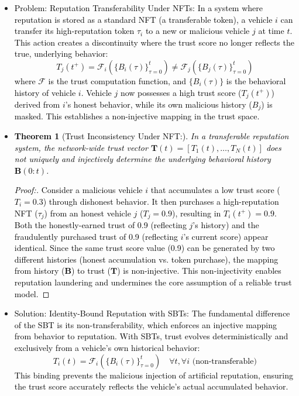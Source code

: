 \cite{cho2010survey}\documentclass[journal,comsoc,twoside]{IEEEtran}
\newtheorem{theorem}{Theorem}
\begin{document}
\begin{itemize}
    \item \textcolor{black}{Problem: Reputation Transferability Under NFTs:
    In a system where reputation is stored as a standard NFT (a transferable token), a vehicle $i$ can transfer its high-reputation token $\tau_i$ to a new or malicious vehicle $j$ at time $t$. This action creates a discontinuity where the trust score no longer reflects the true, underlying behavior:}
    \textcolor{black}{\begin{equation}
    T_j(t^+) = \mathcal{F}_i(\{B_i(\tau)\}_{\tau=0}^{t}) \neq \mathcal{F}_j(\{B_j(\tau)\}_{\tau=0}^{t})
    \label{nft_transfer}
    \end{equation}
    where $\mathcal{F}$ is the trust computation function, and $\{B_i(\tau)\}$ is the behavioral history of vehicle $i$. Vehicle $j$ now possesses a high trust score ($T_j(t^+)$) derived from $i$'s honest behavior, while its own malicious history ($B_j$) is masked. This establishes a non-injective mapping in the trust space.}

    \item \textcolor{black}{
    \begin{theorem}[Trust Inconsistency Under NFT:]
    \label{thm:nft_noninjective}
    In a transferable reputation system, the network-wide trust vector $\mathbf{T}(t) = [T_1(t), \ldots, T_N(t)]$ does not uniquely and injectively determine the underlying behavioral history $\mathbf{B}(0:t)$.
    \end{theorem}
    }
    \textcolor{black}{
    \begin{proof}[Proof:]
    Consider a malicious vehicle $i$ that accumulates a low trust score ($T_i = 0.3$) through dishonest behavior. It then purchases a high-reputation NFT ($\tau_j$) from an honest vehicle $j$ ($T_j = 0.9$), resulting in $T_i(t^+) = 0.9$. Both the honestly-earned trust of 0.9 (reflecting $j$'s history) and the fraudulently purchased trust of 0.9 (reflecting $i$'s current score) appear identical. Since the same trust score value (0.9) can be generated by two different histories (honest accumulation vs. token purchase), the mapping from history ($\mathbf{B}$) to trust ($\mathbf{T}$) is non-injective. This non-injectivity enables reputation laundering and undermines the core assumption of a reliable trust model.
    \end{proof} }

    \item \textcolor{black}{Solution: Identity-Bound Reputation with SBTs:
    The fundamental difference of the SBT is its non-transferability, which enforces an injective mapping from behavior to reputation. With SBTs, trust evolves deterministically and exclusively from a vehicle's own historical behavior:}
    \textcolor{black}{
    \begin{equation}
    \label{sbt_injective}
    T_i(t) = \mathcal{F}_i(\{B_i(\tau)\}_{\tau=0}^{t}) \quad \forall t, \forall i \text{ (non-transferable)}
    \end{equation}
    This binding prevents the malicious injection of artificial reputation, ensuring the trust score accurately reflects the vehicle's actual accumulated behavior.}


\end{itemize}
\end{document}
